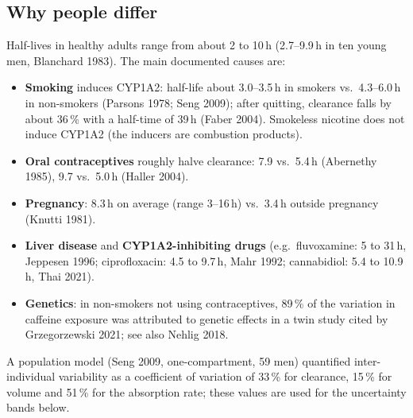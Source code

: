 \documentclass[10pt,a4paper]{article}
\begin{document}
\subsection{Why people differ}
\label{sec:variability}
Half-lives in healthy adults range from about 2 to 10\,h (2.7--9.9\,h in ten young men, Blanchard 1983).
The main documented causes are:
\begin{itemize}
\item \textbf{Smoking} induces CYP1A2: half-life about 3.0--3.5\,h in smokers vs.\ 4.3--6.0\,h in non-smokers
(Parsons 1978; Seng 2009); after quitting, clearance falls by about 36\,\% with a half-time of 39\,h
(Faber 2004). Smokeless nicotine does not induce CYP1A2 (the inducers are combustion products).
\item \textbf{Oral contraceptives} roughly halve clearance: 7.9 vs.\ 5.4\,h (Abernethy 1985), 9.7 vs.\ 5.0\,h
(Haller 2004).
\item \textbf{Pregnancy}: 8.3\,h on average (range 3--16\,h) vs.\ 3.4\,h outside pregnancy (Knutti 1981).
\item \textbf{Liver disease} and \textbf{CYP1A2-inhibiting drugs} (e.g.\ fluvoxamine: 5 to 31\,h, Jeppesen 1996;
ciprofloxacin: 4.5 to 9.7\,h, Mahr 1992; cannabidiol: 5.4 to 10.9\,h, Thai 2021).
\item \textbf{Genetics}: in non-smokers not using contraceptives, 89\,\% of the variation in caffeine
exposure was attributed to genetic effects in a twin study cited by Grzegorzewski 2021; see also Nehlig 2018.
\end{itemize}
A population model (Seng 2009, one-compartment, 59 men) quantified inter-individual variability as a
coefficient of variation of 33\,\% for clearance, 15\,\% for volume and 51\,\% for the absorption rate;
these values are used for the uncertainty bands below.
\end{document}
